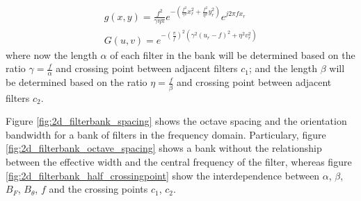 \documentclass[journal]{IEEEtran}
\begin{document}
\begin{equation}\label{eq:gabor_function_2d_spacefreq_bank}
    \begin{gathered}
         g(x,y) =  \frac{f^2}{\gamma \eta \pi} e ^{-\left(\frac{f^2}{\gamma^2} x_r^2 + \frac{f^2}{\eta^2} y_r^2\right)} e ^{j 2 \pi f x_r } \\
         G(u,v) =  e ^{-\left(\frac{\pi}{f}\right)^2\left( \gamma^2 (u_r-f)^2 + \eta^2 v_r^2\right)}
     \end{gathered}
\end{equation}
where now the length $\alpha$ of each filter in the bank will be determined based on the ratio $\gamma = \frac{f}{\alpha}$ and crossing point between adjacent filters $c_1$; and the length $\beta$ will be determined based on the ratio $\eta = \frac{f}{\beta}$ and crossing point between adjacent filters $c_2$.

Figure \ref{fig:2d_filterbank_spacing} shows the octave spacing and the orientation bandwidth for a bank of filters in the frequency domain. Particulary, figure \ref{fig:2d_filterbank_octave_spacing} shows a bank without the relationship between the effective width and the central frequency of the filter, whereas figure \ref{fig:2d_filterbank_half_crossingpoint} show the interdependence between $\alpha$, $\beta$, $B_F$, $B_{\theta}$, $f$ and the crossing points $c_1$, $c_2$.
\end{document}
